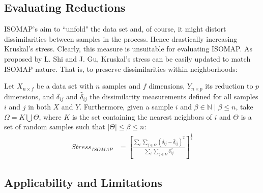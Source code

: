 \documentclass[12pt]{report}
\begin{document}
\subsection{Evaluating Reductions}

ISOMAP's aim to ``unfold" the data set and, of course, it might distort dissimilarities between samples in the process. Hence drastically increasing Kruskal's stress. Clearly, this measure is unsuitable for evaluating ISOMAP. As proposed by L. Shi and J. Gu, Kruskal's stress can be easily updated to match ISOMAP nature. That is, to preserve dissimilarities within neighborhoods: \cite{shi2012fast}

Let $X_{n \times f}$ be a data set with $n$ samples and $f$ dimensions, $Y_{n \times p}$ its reduction to $p$ dimensions, and $\delta_{ij}$ and $\hat{\delta}_{ij}$ the dissimilarity measurements defined for all samples $i$ and $j$ in both $X$ and $Y$. Furthermore, given a sample $i$ and $\beta \in \mathbb{N} \mid \beta \le n$, take $\Omega=K \bigcup \Theta$, where $K$ is the set containing the nearest neighbors of $i$ and $\Theta$ is a set of random samples such that $|\Theta| \le \beta \le n$:
\begin{align*}
	Stress_{ISOMAP} &= [\frac{\sum_i \sum_{j \in \Omega} (\delta_{ij} - \hat{\delta}_{ij})^2}{\sum_i \sum_{j \in \Omega} \delta_{ij}^2}]^{\frac{1}{2}}
\end{align*}

\newpage
\subsection{Applicability and Limitations}
\end{document}
